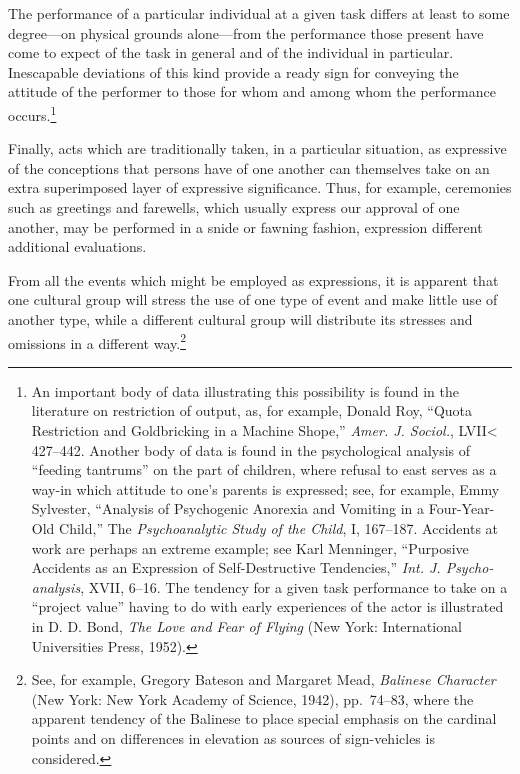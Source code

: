 \documentclass[openany,nobib]{tufte-book}
\begin{document}
The performance of a particular individual at a given task differs at
least to some degree---on physical grounds alone---from the performance
those present have come to expect of the task in general and of the
individual in particular. Inescapable deviations of this kind provide a
ready sign for conveying the attitude of the performer to those for whom
and among whom the performance occurs.\footnote{An important body of
  data illustrating this possibility is found in the literature on
  restriction of output, as, for example, Donald Roy, ``Quota
  Restriction and Goldbricking in a Machine Shope,'' \emph{Amer. J.
  Sociol.}, LVII\textless{} 427--442. Another body of data is found in
  the psychological analysis of ``feeding tantrums'' on the part of
  children, where refusal to east serves as a way-in which attitude to
  one's parents is expressed; see, for example, Emmy Sylvester,
  ``Analysis of Psychogenic Anorexia and Vomiting in a Four-Year-Old
  Child,'' The \emph{Psychoanalytic Study of the Child}, I, 167--187.
  Accidents at work are perhaps an extreme example; see Karl Menninger,
  ``Purposive Accidents as an Expression of Self-Destructive
  Tendencies,'' \emph{Int. J. Psycho-analysis}, XVII, 6--16. The
  tendency for a given task performance to take on a ``project value''
  having to do with early experiences of the actor is illustrated in D.
  D. Bond, \emph{The Love and Fear of Flying} (New York: International
  Universities Press, 1952).}

Finally, acts which are traditionally taken, in a particular situation,
as expressive of the conceptions that persons have of one another can
themselves take on an extra superimposed layer of expressive
significance. Thus, for example, ceremonies such as greetings and
farewells, which usually express our approval of one another, may be
performed in a snide or fawning fashion, expression different additional
evaluations.

From all the events which might be employed as expressions, it is
apparent that one cultural group will stress the use of one type of
event and make little use of another type, while a different cultural
group will distribute its stresses and omissions in a different
way.\footnote{See, for example, Gregory Bateson and Margaret Mead,
  \emph{Balinese Character} (New York: New York Academy of Science,
  1942), pp.~74--83, where the apparent tendency of the Balinese to
  place special emphasis on the cardinal points and on differences in
  elevation as sources of sign-vehicles is considered.}
\end{document}
